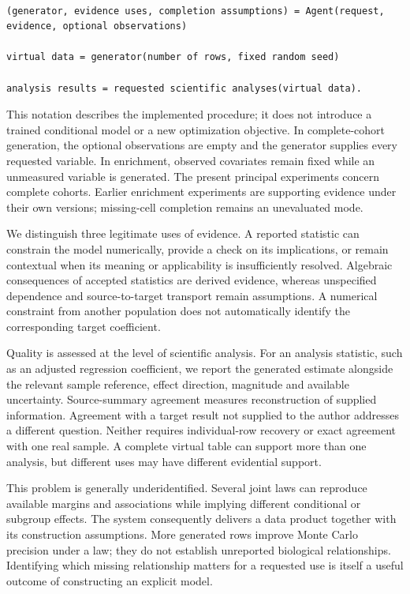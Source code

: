 \documentclass[10pt,twocolumn]{article}
\begin{document}
\begin{lstlisting}

(generator, evidence uses, completion assumptions) = Agent(request, evidence, optional observations)

virtual data = generator(number of rows, fixed random seed)

analysis results = requested scientific analyses(virtual data).

\end{lstlisting}

This notation describes the implemented procedure; it does not introduce a trained conditional model or a new optimization objective. In complete-cohort generation, the optional observations are empty and the generator supplies every requested variable. In enrichment, observed covariates remain fixed while an unmeasured variable is generated. The present principal experiments concern complete cohorts. Earlier enrichment experiments are supporting evidence under their own versions; missing-cell completion remains an unevaluated mode.


We distinguish three legitimate uses of evidence. A reported statistic can constrain the model numerically, provide a check on its implications, or remain contextual when its meaning or applicability is insufficiently resolved. Algebraic consequences of accepted statistics are derived evidence, whereas unspecified dependence and source-to-target transport remain assumptions. A numerical constraint from another population does not automatically identify the corresponding target coefficient.


Quality is assessed at the level of scientific analysis. For an analysis statistic, such as an adjusted regression coefficient, we report the generated estimate alongside the relevant sample reference, effect direction, magnitude and available uncertainty. Source-summary agreement measures reconstruction of supplied information. Agreement with a target result not supplied to the author addresses a different question. Neither requires individual-row recovery or exact agreement with one real sample. A complete virtual table can support more than one analysis, but different uses may have different evidential support.


This problem is generally underidentified. Several joint laws can reproduce available margins and associations while implying different conditional or subgroup effects. The system consequently delivers a data product together with its construction assumptions. More generated rows improve Monte Carlo precision under a law; they do not establish unreported biological relationships. Identifying which missing relationship matters for a requested use is itself a useful outcome of constructing an explicit model.
\end{document}
